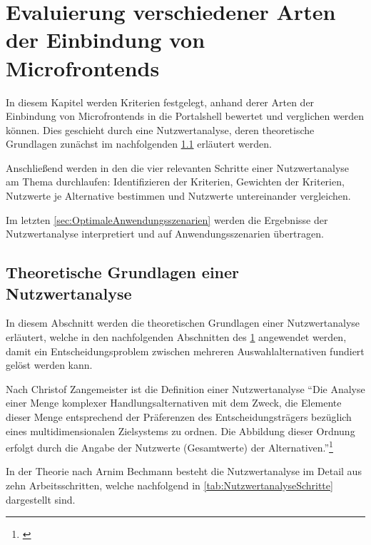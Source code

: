 \section{Evaluierung verschiedener Arten der Einbindung von Microfrontends}\label{sec:Evaluierung}

In diesem Kapitel werden Kriterien festgelegt, anhand derer Arten der Einbindung von Microfrontends in die Portalshell bewertet und verglichen werden können. Dies geschieht durch eine Nutzwertanalyse, deren theoretische Grundlagen zunächst im nachfolgenden \cref{sec:TheoretischeGrundlagenEinerEvaluierung} erläutert werden. 

Anschließend werden in den  die vier relevanten Schritte einer Nutzwertanalyse am Thema durchlaufen: Identifizieren der Kriterien, Gewichten der Kriterien, Nutzwerte je Alternative bestimmen und Nutzwerte untereinander vergleichen.

Im letzten \cref{sec:OptimaleAnwendungsszenarien} werden die Ergebnisse der Nutzwertanalyse interpretiert und auf Anwendungsszenarien übertragen.

\subsection{Theoretische Grundlagen einer Nutzwertanalyse}\label{sec:TheoretischeGrundlagenEinerEvaluierung}

In diesem Abschnitt werden die theoretischen Grundlagen einer Nutzwertanalyse erläutert, welche in den nachfolgenden Abschnitten des \cref{sec:Evaluierung} angewendet werden, damit ein Entscheidungsproblem zwischen mehreren Auswahlalternativen fundiert gelöst werden kann.

Nach Christof Zangemeister ist die Definition einer Nutzwertanalyse \enquote{Die Analyse einer Menge komplexer Handlungsalternativen mit dem Zweck, die Elemente dieser Menge entsprechend der Präferenzen des Entscheidungsträgers bezüglich eines multidimensionalen Zielsystems zu ordnen. Die Abbildung dieser Ordnung erfolgt durch die Angabe der Nutzwerte (Gesamtwerte) der Alternativen.}\footnote{\cite[][45]{Zangemeister1971}}

In der Theorie nach Arnim Bechmann besteht die Nutzwertanalyse im Detail aus zehn Arbeitsschritten, welche nachfolgend in \cref{tab:NutzwertanalyseSchritte} dargestellt sind.

